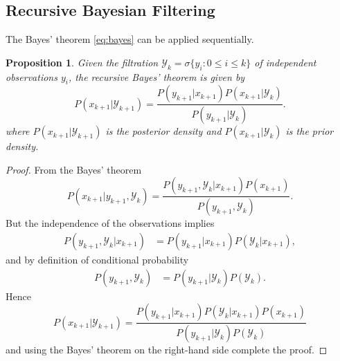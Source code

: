 \documentclass{article}
\newtheorem{prop}[thm]{Proposition}
\theoremstyle{definition}
\theoremstyle{remark}
\newcommand{\filtrationObs}[1]{\ensuremath{\mathscr{Y}_{#1}}}
\begin{document}










\subsection{Recursive Bayesian Filtering}
The Bayes' theorem \eqref{eq:bayes} can be applied sequentially. 
\begin{prop}
Given the filtration $\filtrationObs{k}=\sigma\{ y_i: 0 \leq i\leq k\}$ of independent observations $y_i$, the \emph{recursive Bayes' theorem} is given by
\begin{equation}\label{eq:recBay}
P(x_{k+1}|\filtrationObs{k+1}) = \frac{P(y_{k+1}|x_{k+1})P(x_{k+1}|\filtrationObs{k})}{P(y_{k+1}|\filtrationObs{k})} .
\end{equation}
where $P(x_{k+1}|\filtrationObs{k+1})$ is the \emph{posterior density} and $P(x_{k+1}|\filtrationObs{k})$ is the \emph{prior density}.
\end{prop}
\begin{proof}
From the Bayes' theorem
\begin{equation*}
P(x_{k+1}|y_{k+1}, \filtrationObs{k}) = \frac{P(y_{k+1}, \filtrationObs{k}|x_{k+1})P(x_{k+1})}{P(y_{k+1},\filtrationObs{k})}.
\end{equation*}
But the independence of the observations implies
\begin{align*}
P(y_{k+1}, \filtrationObs{k}|x_{k+1})&=P(y_{k+1}|x_{k+1})P(\filtrationObs{k}|x_{k+1}),
\end{align*} 
and by definition of conditional probability
\begin{align*}
P(y_{k+1}, \filtrationObs{k})&=P(y_{k+1}|\filtrationObs{k})P(\filtrationObs{k}).
\end{align*} 
Hence
\begin{equation*}
P(x_{k+1}|\filtrationObs{{k+1}}) = \frac{P(y_{k+1}|x_{k+1})P(\filtrationObs{k}|x_{k+1})P(x_{k+1})}{P(y_{k+1}|\filtrationObs{k})P(\filtrationObs{k})}
\end{equation*} 
and using the Bayes' theorem on the right-hand side complete the proof.
\end{proof}
\end{document}

